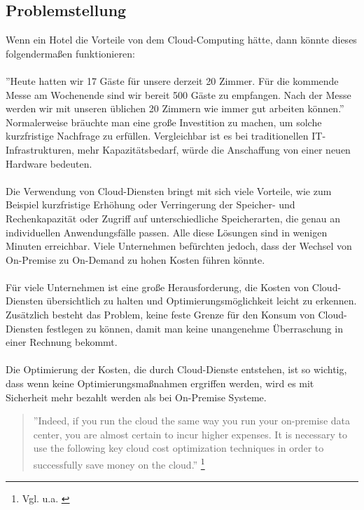 \subsection{Problemstellung}
Wenn ein Hotel die Vorteile von dem Cloud-Computing hätte, dann könnte dieses folgendermaßen funktionieren:
\\\\
”Heute hatten wir 17 Gäste für unsere derzeit 20 Zimmer. Für die kommende Messe am Wochenende sind wir bereit 500 Gäste zu empfangen. Nach der Messe werden wir mit unseren üblichen 20 Zimmern wie immer gut arbeiten können.”
Normalerweise bräuchte man eine große Investition zu machen, um solche kurzfristige Nachfrage zu erfüllen. Vergleichbar ist es bei traditionellen IT-Infrastrukturen, mehr Kapazitätsbedarf, würde die Anschaffung von einer neuen Hardware bedeuten.
\\\\
Die Verwendung von Cloud-Diensten bringt mit sich viele Vorteile, wie zum Beispiel kurzfristige Erhöhung oder Verringerung der Speicher- und Rechenkapazität oder Zugriff auf unterschiedliche Speicherarten, die genau an individuellen Anwendungsfälle passen. Alle diese Lösungen sind in wenigen Minuten erreichbar. Viele Unternehmen befürchten jedoch, dass der Wechsel von On-Premise zu On-Demand zu hohen Kosten führen könnte.
\\\\
Für viele Unternehmen ist eine große Herausforderung, die Kosten von Cloud-Diensten übersichtlich zu halten und Optimierungsmöglichkeit leicht zu erkennen. Zusätzlich besteht das Problem, keine feste Grenze für den Konsum von Cloud-Diensten festlegen zu können, damit man keine unangenehme Überraschung in einer Rechnung bekommt. 
\\\\
Die Optimierung der Kosten, die durch Cloud-Dienste entstehen, ist so wichtig, dass wenn keine Optimierungsmaßnahmen ergriffen werden, wird es mit Sicherheit mehr bezahlt werden als bei On-Premise Systeme.
\\
\begin{quote}
    ”Indeed, if you run the cloud the same way you run your on-premise data center, you are almost certain to incur higher expenses. It is necessary to use the following key cloud cost optimization techniques in order to successfully save money on the cloud.”
\footnote{Vgl. u.a. \cite{CCB}}
\end{quote}

